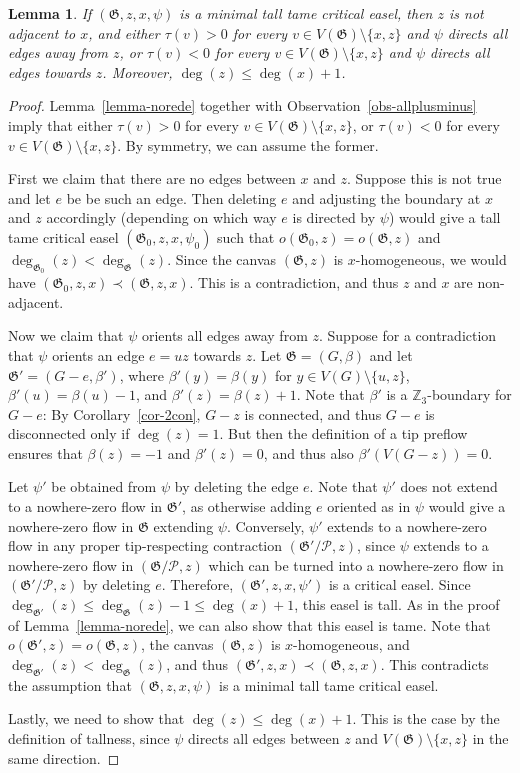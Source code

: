 \documentclass{article}
\newcommand{\Z}{\mathbb{Z}_3}
\newcommand{\PP}{\mathcal{P}}
\newcommand\g{\mathfrak{G}}
\newtheorem{lemma}[theorem]{Lemma}
\begin{document}
\begin{lemma}\label{lemma-sameor}
If $(\g,z,x,\psi)$ is a minimal tall tame critical easel, then $z$ is not adjacent to $x$,
and either $\tau(v)>0$ for every $v\in V(\g)\setminus\{x,z\}$ and $\psi$ directs all edges away from $z$, or
$\tau(v)<0$ for every $v\in V(\g)\setminus\{x,z\}$ and $\psi$ directs all edges towards $z$.
Moreover, $\deg(z)\le \deg(x)+1$.
\end{lemma}
\begin{proof}

Lemma~\ref{lemma-norede} together with Observation~\ref{obs-allplusminus} imply that either $\tau(v)>0$ for every $v\in V(\g)\setminus\{x,z\}$,
or $\tau(v)<0$ for every $v\in V(\g)\setminus\{x,z\}$.  By symmetry, we can assume the former.

First we claim that there are no edges between $x$ and $z$.   Suppose this is not true and let $e$ be be such an edge. Then deleting $e$ and adjusting the boundary at $x$ and $z$ accordingly (depending on which way $e$ is directed by $\psi$) would give a tall tame critical easel $(\g_0,z,x,\psi_0)$
such that $o(\g_0,z)=o(\g,z)$ and $\deg_{\g_0}(z)<\deg_{\g}(z)$. Since the canvas $(\g,z)$ is $x$-homogeneous, we would have $(\g_0,z,x)\prec (\g,z,x)$.  This is a contradiction, and thus $z$ and $x$ are non-adjacent.

Now we claim that $\psi$ orients all edges away from $z$. Suppose for a contradiction that $\psi$ orients an edge $e=uz$ towards $z$.
Let $\g=(G,\beta)$ and let $\g'=(G-e,\beta')$, where $\beta'(y)=\beta(y)$ for $y\in V(G)\setminus\{u,z\}$, $\beta'(u)=\beta(u)-1$,
and $\beta'(z)=\beta(z)+1$.  Note that $\beta'$ is a $\Z$-boundary for $G-e$: By Corollary~\ref{cor-2con}, $G-z$ is connected,
and thus $G-e$ is disconnected only if $\deg(z)=1$.  But then the definition of a tip preflow ensures that $\beta(z)=-1$ and $\beta'(z)=0$,
and thus also $\beta'(V(G-z))=0$.

Let $\psi'$ be obtained from $\psi$ by deleting the edge $e$.
Note that $\psi'$ does not extend to a nowhere-zero flow in $\g'$, as otherwise adding $e$ oriented as in $\psi$ would give a nowhere-zero flow in $\g$ extending $\psi$.
Conversely, $\psi'$ extends to a nowhere-zero flow in any proper tip-respecting contraction $(\g'/ \PP,z)$, since $\psi$ extends to a nowhere-zero flow in $(\g / \PP,z)$
which can be turned into a nowhere-zero flow in $(\g'/ \PP,z)$ by deleting $e$.  Therefore, $(\g',z,x,\psi')$ is a critical easel.
Since $\deg_{\g'}(z)\le \deg_{\g}(z)-1\le \deg(x)+1$, this easel is tall.  As in the proof of Lemma~\ref{lemma-norede}, we can also show that this easel is tame.
Note that $o(\g',z)=o(\g,z)$, the canvas $(\g,z)$ is $x$-homogeneous, and $\deg_{\g'}(z)<\deg_{\g}(z)$, and thus
$(\g',z,x)\prec (\g,z,x)$.  This contradicts the assumption that $(\g,z,x,\psi)$ is a minimal tall tame critical easel.

Lastly, we need to show that $\deg(z) \leq \deg(x) +1$. This is the case by the definition of tallness,
since $\psi$ directs all edges between $z$ and $V(\g)\setminus \{x,z\}$ in the same
direction.
\end{proof}
\end{document}
